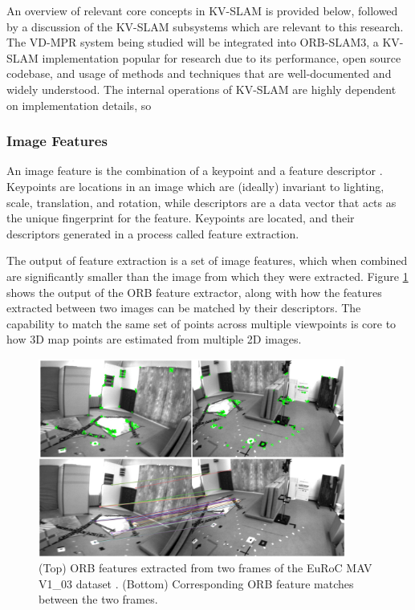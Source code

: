 An overview of relevant core concepts in KV-SLAM is provided below, followed by a discussion of the KV-SLAM subsystems which are relevant to this research. 
The VD-MPR system being studied will be integrated into ORB-SLAM3, a KV-SLAM implementation popular for research due to its performance, open source codebase, and usage of methods and techniques that are well-documented and widely understood. The internal operations of KV-SLAM are highly dependent on implementation details, so 

\subsubsection{Image Features}

An image feature is the combination of a keypoint and a feature descriptor \cite{loweObjectRecognitionLocal1999}. Keypoints are locations in an image which are (ideally) invariant to lighting, scale, translation, and rotation\cite{shiGoodFeaturesTrack1994}, while descriptors are a data vector that acts as the unique fingerprint for the feature. Keypoints are located, and their descriptors generated in a process called feature extraction.

The output of feature extraction is a set of image features, which when combined are significantly smaller than the image from which they were extracted. Figure \ref{fig:feature_extraction_and_matching} shows the output of the ORB feature extractor, along with how the features extracted between two images can be matched by their descriptors. The capability to match the same set of points across multiple viewpoints is core to how 3D map points are estimated from multiple 2D images.

\begin{figure}[!ht]
    \centering
    \includegraphics[width=0.9\textwidth]{resources/feature_extraction_and_matching.png}
    \caption[Image Feature Extraction and Matching]{(Top) ORB features extracted from two frames of the EuRoC MAV V1\_03 dataset \cite{burriEuRoCMicroAerial2016}. (Bottom) Corresponding ORB feature matches between the two frames.}
    \label{fig:feature_extraction_and_matching}
\end{figure}

